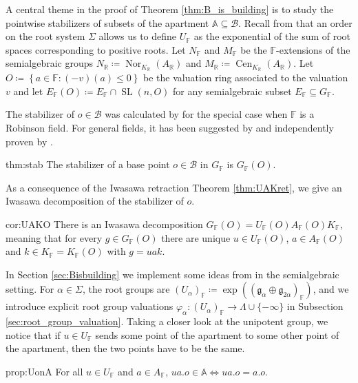 \documentclass[12pt]{amsart}
\newcommand{\F}{\mathbb{F} }
\newcommand{\R}{\mathbb{R} }
\newcommand{\frakg}{\mathfrak{g}}
\newcommand{\A}{\mathbb{A}}
\newcommand{\B}{\mathcal{B}}
\numberwithin{equation}{section}
\theoremstyle{remark} %
\begin{document}
A central theme in the proof of Theorem \ref{thm:B_is_building} is to study the pointwise stabilizers of subsets of the apartment $\A \subseteq \B$. Recall from \cite[Section \ref{I-sec:decompositions}]{AppAGRCF} that an order on the root system $\Sigma$ allows us to define $U_\F$ as the exponential of the sum of root spaces corresponding to positive roots. Let $N_\F$ and $M_\F$ be the $\F$-extensions of the semialgebraic groups $N_\R \coloneq \operatorname{Nor}_{K_\R}(A_\R)$ and $M_\R \coloneq \operatorname{Cen}_{K_\R}(A_\R)$. Let $O \coloneq \left\{ a \in \F \colon (-v)(a) \leq 0 \right\}$ be the valuation ring associated to the valuation $v$ and let $E_\F(O) \coloneq E_\F \cap \operatorname{SL}(n,O)$ for any semialgebraic subset $E_\F \subseteq G_\F$.

The stabilizer of $o \in \B$ was calculated by \cite{Tho} for the special case when $\F$ is a Robinson field. For general fields, it has been suggested by \cite{KrTe} and independently proven by \cite{BIPP23arxiv}.
 
\begin{reptheorem}{thm:stab} 
	The stabilizer of a base point $o\in\B$ in $G_\F$ is $G_\F(O)$.
\end{reptheorem}

As a consequence of the Iwasawa retraction Theorem \ref{thm:UAKret}, we give an Iwasawa decomposition of the stabilizer of $o$.

\begin{repcorollary}{cor:UAKO}
	There is an Iwasawa decomposition $G_\F(O) = U_\F(O) A_\F(O) K_\F$, meaning that for every $g \in G_\F(O)$ there are unique $u \in U_\F(O)$, $a\in A_\F(O)$ and $k\in K_\F=K_\F(O)$ with $g=uak$.
\end{repcorollary}

In Section \ref{sec:Bisbuilding} we implement some ideas from \cite{BrTi} in the semialgebraic setting. For $\alpha \in \Sigma$, the root groups are $(U_\alpha)_\F \coloneq \exp( (\frakg_\alpha \oplus \frakg_{2\alpha})_\F)$, 
and we introduce explicit root group valuations $\varphi_\alpha \colon (U_\alpha)_\F \to \Lambda \cup \{-\infty\}$ in Subsection \ref{sec:root_group_valuation}. Taking a closer look at the unipotent group, we notice that if $u \in U_\F$ sends some point of the apartment to some other point of the apartment, then the two points have to be the same.

\begin{repproposition}{prop:UonA}
	For all $u\in U_\F$ and $a \in A_\F$, $
	ua.o \in \mathbb{A} \iff ua.o = a.o. 
	$
\end{repproposition}
\end{document}
